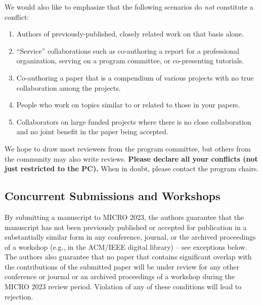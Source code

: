 \documentclass{common/sig-alternate}
\begin{document}
We would also like to emphasize that the following scenarios do {\em not} constitute a conflict:
\begin{enumerate}
\item Authors of previously-published, closely related work on that basis alone.
\item ``Service'' collaborations such as co-authoring a report for a professional organization, serving on a program committee, or co-presenting tutorials.
\item Co-authoring a paper that is a compendium of various projects with no true collaboration among the projects.
\item People who work on topics similar to or related to those in your papers.
\item Collaborators on large funded projects where there is no close collaboration and no joint benefit in the paper being accepted.
\end{enumerate}

We hope to draw most reviewers from the program committee, but others
from the community may also write reviews. {\bf Please declare all your conflicts (not just restricted to the PC).} When in doubt, please contact the program chairs.



\subsection{Concurrent Submissions and Workshops}

By submitting a manuscript to MICRO 2023, the authors guarantee that the manuscript has not been previously published or accepted for publication in a substantially similar form in any conference, journal, or the archived proceedings of a workshop (e.g., in the ACM/IEEE digital library) -- see exceptions below. The authors also guarantee that no paper that contains significant overlap with the contributions of the submitted paper will be under review for any other conference or journal or an archived proceedings of a workshop during the MICRO 2023 review period. Violation of any of these conditions will lead to rejection.
\end{document}
